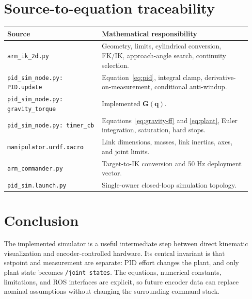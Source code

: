 \documentclass[11pt,a4paper]{article}
\newcommand{\vect}[1]{\bm{#1}}
\newcommand{\code}[1]{\texttt{#1}}
\begin{document}
\section{Source-to-equation traceability}
\begin{table}[H]
\centering
\begin{tabular}{p{}p{}}
\toprule Source & Mathematical responsibility\\\midrule
\code{arm\_ik\_2d.py} & Geometry, limits, cylindrical conversion, FK/IK,
approach-angle search, continuity selection.\\
\code{pid\_sim\_node.py: PID.update} & Equation~\eqref{eq:pid}, integral clamp,
derivative-on-measurement, conditional anti-windup.\\
\code{pid\_sim\_node.py: gravity\_torque} & Implemented $\vect G(\vect q)$.\\
\code{pid\_sim\_node.py: timer\_cb} & Equations~\eqref{eq:gravity-ff} and
\eqref{eq:plant}, Euler integration, saturation, hard stops.\\
\code{manipulator.urdf.xacro} & Link dimensions, masses, link inertias, axes,
and joint limits.\\
\code{arm\_commander.py} & Target-to-IK conversion and 50 Hz deployment vector.\\
\code{pid\_sim.launch.py} & Single-owner closed-loop simulation topology.\\
\bottomrule
\end{tabular}
\end{table}

\section*{Conclusion}
The implemented simulator is a useful intermediate step between direct
kinematic visualization and encoder-controlled hardware. Its central invariant
is that setpoint and measurement are separate: PID effort changes the plant,
and only plant state becomes \code{/joint\_states}. The equations, numerical
constants, limitations, and ROS interfaces are explicit, so future encoder data
can replace nominal assumptions without changing the surrounding command stack.
\end{document}
